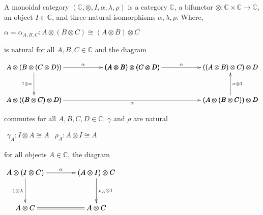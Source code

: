 \begin{definition}
    A monoidal category $(\mathbb{C},\otimes,I,\alpha,\lambda,\rho)$ is a category $\mathbb{C}$, a bifunctor $\otimes : \mathbb{C} \times \mathbb{C} \rightarrow \mathbb{C}$, 
    an object $I \in \mathbb{C}$, and three natural isomorphisms $\alpha,\lambda,\rho$.  Where,
    \begin{center}
        \begin{math}
            \alpha = \alpha_{A,B,C}:A \otimes(B \otimes C) \cong (A \otimes B) \otimes C
        \end{math}
    \end{center}
    is natural for all $A,B,C \in \mathbb{C}$ and the diagram
    \begin{center}
        \begin{math}
            \bfig
            \ptriangle|all|/->`->`/<1500,500>[
                A \otimes (B \otimes (C \otimes D))`
                (A \otimes B) \otimes (C \otimes D)`
                A \otimes ((B \otimes C)\otimes D);
                \alpha`
                1 \otimes \alpha`
            ]
            \qtriangle(1500,0)|alr|/->``<-/<1500,500>[
                (A \otimes B) \otimes (C \otimes D)`
                ((A \otimes B)\otimes C)\otimes D`
                (A \otimes (B \otimes C))\otimes D;
                \alpha`
                `
                \alpha \otimes 1
                ]
            \morphism|b|/->/<3000,0>[
                A \otimes ((B \otimes C)\otimes D)`
                (A \otimes(B \otimes C))\otimes D;
                \alpha
                ]
            \efig
        \end{math}
    \end{center}
    commutes for all $A,B,C,D \in \mathbb{C}$.  $\gamma$ and $\rho$ are natural
    \begin{center}
        \begin{math}
            \begin{array}{lr}
                \gamma_A : I \otimes A \cong A & \rho_A : A \otimes I \cong A
            \end{array}
        \end{math}
    \end{center} 
    for all objects $A \in \mathbb{C}$, the diagram
    \begin{center}
        \begin{math}
            \bfig
                    \square|alrr|/->`->`->`=/<1000,500>[
                        A \otimes (I \otimes C)`
                        (A \otimes I) \otimes C`
                        A \otimes C`
                        A \otimes C;
                        \alpha`
                        1 \otimes \lambda`
                        \rho_A \otimes 1`]
                    \efig
        \end{math}
    \end{center}
    \cite{maclane1971}
\end{definition}



